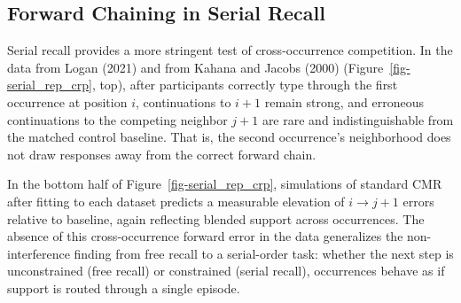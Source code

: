\documentclass[
  letterpaper,
  11pt,
  english,
  singlespacing,
  headsepline]{MastersDoctoralThesis}
\begin{document}
\subsection{Forward Chaining in Serial
Recall}\label{forward-chaining-in-serial-recall}

Serial recall provides a more stringent test of cross-occurrence
competition. In the data from Logan (2021) and from Kahana and Jacobs
(2000) (Figure~\ref{fig-serial_rep_crp}, top), after participants
correctly type through the first occurrence at position \(i\),
continuations to \(i{+}1\) remain strong, and erroneous continuations to
the competing neighbor \(j{+}1\) are rare and indistinguishable from the
matched control baseline. That is, the second occurrence's neighborhood
does not draw responses away from the correct forward chain.

In the bottom half of Figure~\ref{fig-serial_rep_crp}, simulations of
standard CMR after fitting to each dataset predicts a measurable
elevation of \(i\!\rightarrow\!j{+}1\) errors relative to baseline,
again reflecting blended support across occurrences. The absence of this
cross-occurrence forward error in the data generalizes the
non-interference finding from free recall to a serial-order task:
whether the next step is unconstrained (free recall) or constrained
(serial recall), occurrences behave as if support is routed through a
single episode.
\end{document}
